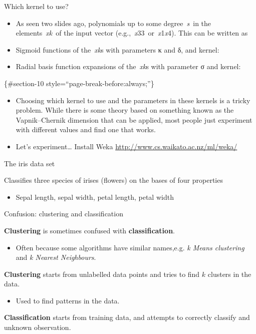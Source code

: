 \documentclass[compress]{beamer}
\providecommand{\tightlist}{%
  \setlength{\itemsep}{0pt}\setlength{\parskip}{0pt}}
\begin{document}
\begin{frame}{Which kernel to use?}

\begin{itemize}
\tightlist
\item
  As seen two slides ago, polynomials up to some degree~\emph{s}~in the
  elements~\emph{xk}~of the input vector
  (e.g.,~\emph{x}33~or~\emph{x}1\emph{x}4). This can be written as
\item
  Sigmoid functions of the~\emph{xk}s with parameters κ and δ, and
  kernel:
\item
  Radial basis function expansions of the~\emph{xk}s with parameter σ
  and kernel:
\end{itemize}

\{\#section-10 style=``page-break-before:always;''\}

\begin{itemize}
\tightlist
\item
  Choosing which kernel to use and the parameters in these kernels is a
  tricky problem. While there is some theory based on something known as
  the Vapnik--Chernik dimension that can be applied, most people just
  experiment with different values and find one that works.
\item
  Let's experiment\ldots{} Install Weka
  \url{http://www.cs.waikato.ac.nz/ml/weka/}
\end{itemize}

\end{frame}

\begin{frame}{The iris data set}

Classifies three species of irises (flowers) on the bases of four
properties

\begin{itemize}
\tightlist
\item
  Sepal length, sepal width, petal length, petal width
\end{itemize}

\end{frame}

\begin{frame}{Confusion: clustering and classification}

\textbf{Clustering} is sometimes confused with \textbf{classification}.

\begin{itemize}
\tightlist
\item
  Often because some algorithms have similar names,e.g. \emph{k Means
  clustering} and \emph{k Nearest Neighbours}.
\end{itemize}

\textbf{Clustering} starts from unlabelled data points and tries to find
\(k\) clusters in the data.

\begin{itemize}
\tightlist
\item
  Used to find patterns in the data.
\end{itemize}

\textbf{Classification} starts from training data, and attempts to
correctly classify and unknown observation.

\end{frame}
\end{document}
